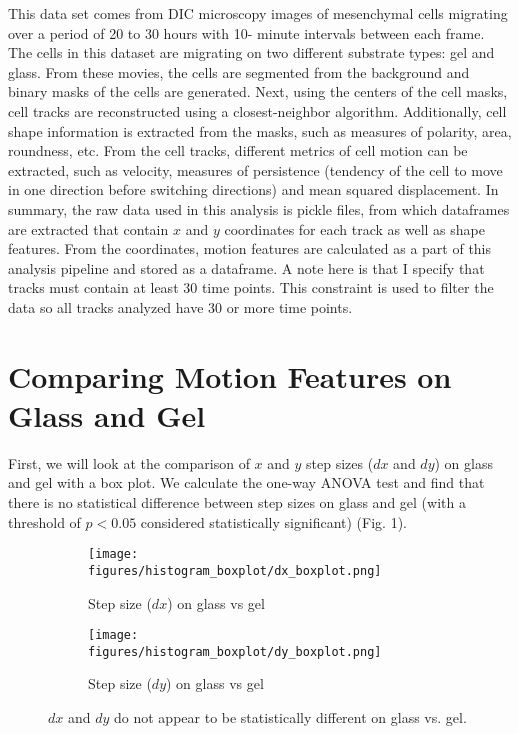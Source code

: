 \documentclass[12pt]{article}
\begin{document}
This data set comes from DIC 
microscopy images of mesenchymal cells migrating over a period of 20 to 30 hours with 10-
minute intervals between each frame. The cells in this dataset are migrating on two different 
substrate types: gel and glass.  From these movies, the cells are segmented from the 
background and binary masks of the cells are generated. Next, using the centers of the cell 
masks, cell tracks are reconstructed using a closest-neighbor algorithm. Additionally, cell shape 
information is extracted from the masks, such as measures of polarity, area, roundness, etc. 
From the cell tracks, different metrics of cell motion can be extracted, such as velocity, 
measures of persistence (tendency of the cell to move in one direction before switching 
directions) and mean squared displacement. In summary, the raw data used in this analysis is 
pickle files, from which dataframes are extracted that contain $x$ and $y$ coordinates for each track as well as shape features. 
From the coordinates, motion features are calculated as a part of this analysis pipeline and stored as a dataframe. A note here is that I specify
that tracks must contain at least 30 time points. This constraint is used to filter the data so all tracks analyzed have 30 or more time points.

\section{Comparing Motion Features on Glass and Gel}

First, we will look at the comparison of $x$ and $y$ step sizes ($dx$ and $dy$) on glass and gel with a box plot. We calculate
the one-way ANOVA test and find that there is no statistical difference between step sizes on glass and gel (with a threshold of $p < 0.05$ considered
statistically significant) (Fig. 1).

\begin{figure}[h!]
  \centering
  \begin{subfigure}[b]{0.4\linewidth}
    \texttt{[image: figures/histogram\_boxplot/dx\_boxplot.png]}
    \caption{Step size ($dx$) on glass vs gel}
  \end{subfigure}
  \begin{subfigure}[b]{0.4\linewidth}
    \texttt{[image: figures/histogram\_boxplot/dy\_boxplot.png]}
    \caption{Step size ($dy$) on glass vs gel}
  \end{subfigure}
  \caption{$dx$ and $dy$ do not appear to be statistically different on glass vs. gel.}
\end{figure}
\end{document}
